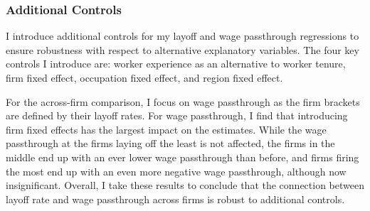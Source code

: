 \subsubsection{Additional Controls}\label{robust:controls}
I introduce additional controls for my layoff and wage passthrough regressions to ensure robustness with respect to alternative explanatory variables. The four key controls I introduce are: worker experience as an alternative to worker tenure, firm fixed effect, occupation fixed effect, and region fixed effect.

For the across-firm comparison, I focus on wage passthrough as the firm brackets are defined by their layoff rates. For wage passthrough, I find that introducing firm fixed effects has the largest impact on the estimates. While the wage passthrough at the firms laying off the least is not affected, the firms in the middle end up with an ever lower wage passthrough than before, and firms firing the most end up with an even more negative wage passthrough, although now insignificant. Overall, I take these results to conclude that the connection between layoff rate and wage passthrough across firms is robust to additional controls.

